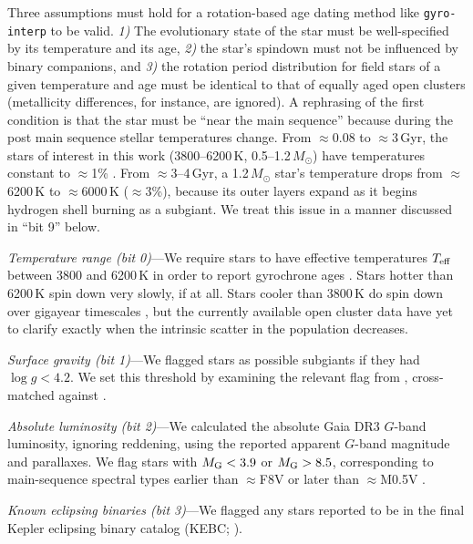 \documentclass[11pt,twocolumn,tighten]{aastex63}
\begin{document}
Three assumptions must hold for a
rotation-based age dating method like \texttt{gyro-interp} to be
valid.  {\it 1)} The evolutionary state of the star must be
well-specified by its temperature and its age, {\it 2)} the star's
spindown must not be influenced by binary companions, and {\it 3)} the
rotation period distribution for field stars of a given temperature
and age must be identical to that of equally aged open clusters
(metallicity differences, for instance, are ignored).  A rephrasing of
the first condition is that the star must be ``near the main
sequence'' because during the post main sequence 
stellar temperatures change.  From $\approx$0.08 to $\approx$3\,Gyr,
the stars of interest in this work (3800--6200\,K,
0.5--1.2\,$M_\odot$) have temperatures constant to $\approx$1\%
\citep{Choi_2016}.  From $\approx$3--4\,Gyr, a 1.2\,$M_\odot$ star's
temperature drops from $\approx$6200\,K to $\approx$6000\,K
($\approx$3\%), because its outer layers expand as it begins hydrogen
shell burning as a subgiant.  We treat this issue in a 
manner discussed in ``bit 9'' below.

{\it Temperature range (bit 0)}---We require stars to have effective
temperatures $T_{\rm eff}$ between 3800 and 6200\,K in order to report
gyrochrone ages \citep{Bouma_2023}.   Stars hotter than 6200\,K spin
down very slowly, if at all.  Stars cooler than 3800\,K do spin down
over gigayear timescales
\citep{2016ApJ...821...93N,2023ApJ...954L..50E,2024arXiv240312129C},
but the currently available open cluster data have yet to clarify
exactly when the intrinsic scatter in the population decreases.

{\it Surface gravity (bit 1)}---We flagged stars as possible subgiants
if they had $\log g < 4.2$.  We set this threshold by examining the
relevant flag from \citet{berger_2018_radii_evolnstates},
cross-matched against \citet{Berger_2020a_catalog}.

{\it Absolute luminosity (bit 2)}---We calculated the absolute Gaia
DR3 $G$-band luminosity, ignoring reddening, using the reported
apparent $G$-band magnitude and parallaxes.  We flag stars with
$M_{\rm G} < 3.9$ or $M_{\rm G} > 8.5$, corresponding to main-sequence
spectral types earlier than $\approx$F8V or later than $\approx$M0.5V
\citep{Pecaut_2013}.

{\it Known eclipsing binaries (bit 3)}---We flagged any stars reported
to be in the final Kepler eclipsing binary catalog (KEBC;
\citealt{2016AJ....151...68K}).
\end{document}
